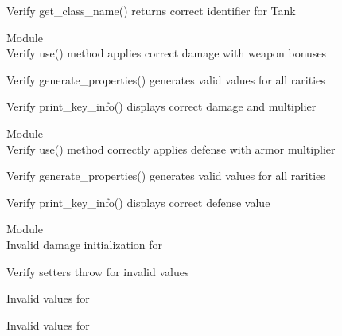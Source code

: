 \begin{DoxyRefList}
\label{test__test000105}%
%
Verify get\+\_\+class\+\_\+name() returns correct identifier for Tank  


\item[Module \doxylink{group___creature_card}{Creature\+Card} ]\hfill \\
\label{test__test000037}%
%
Verify use() method applies correct damage with weapon bonuses  



\label{test__test000038}%
%
Verify generate\+\_\+properties() generates valid values for all rarities  



\label{test__test000039}%
%
Verify print\+\_\+key\+\_\+info() displays correct damage and multiplier  


\item[Module \doxylink{group___defence_spell}{Defence\+Spell} ]\hfill \\
\label{test__test000028}%
%
Verify use() method correctly applies defense with armor multiplier  



\label{test__test000029}%
%
Verify generate\+\_\+properties() generates valid values for all rarities  



\label{test__test000030}%
%
Verify print\+\_\+key\+\_\+info() displays correct defense value  


\item[Module \doxylink{group___error_handling}{Error\+Handling} ]\hfill \\
\label{test__test000010}%
%
Invalid damage initialization for   



\label{test__test000015}%
%
Verify setters throw for invalid values  



\label{test__test000022}%
%
Invalid values for   



\label{test__test000027}%
%
Invalid values for   




\end{DoxyRefList}
